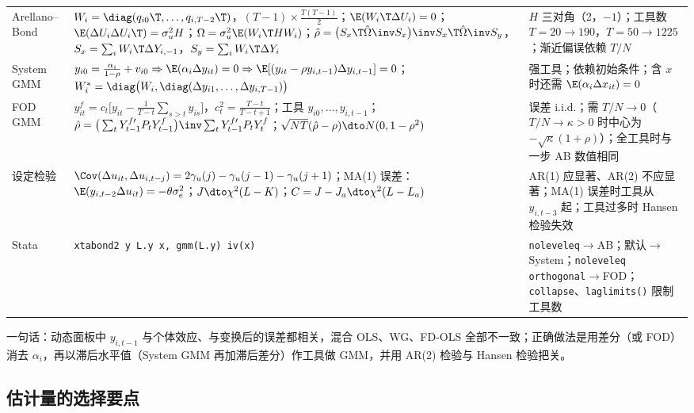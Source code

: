 {\begin{longtable}{>{\raggedright\arraybackslash}p{1.7cm}>{\raggedright\arraybackslash}p{8.0cm}>{\raggedright\arraybackslash}p{5.5cm}}
\addlinespace
Arellano--Bond & $W_i=\diag(q_{i0}\T,\dots,q_{i,T-2}\T)$，$(T-1)\times\frac{T(T-1)}{2}$；$\E(W_i\T\Delta U_i)=0$；$\E(\Delta U_i\Delta U_i\T)=\sigma_u^2H$；$\Omega=\sigma_u^2\E(W_i\T HW_i)$；$\hat\rho=\big(S_x\T\hat\Omega\inv S_x\big)\inv S_x\T\hat\Omega\inv S_y$，$S_x=\sum_iW_i\T\Delta Y_{i,-1}$，$S_y=\sum_iW_i\T\Delta Y_i$ & $H$ 三对角（2，$-1$）；工具数 $T=20\to190$，$T=50\to1225$；渐近偏误依赖 $T/N$\\
\addlinespace
System GMM & $y_{i0}=\frac{\alpha_i}{1-\rho}+v_{i0}\Rightarrow\E(\alpha_i\Delta y_{it})=0\Rightarrow\E[(y_{it}-\rho y_{i,t-1})\Delta y_{i,t-1}]=0$；$W_i^*=\diag\big(W_i,\diag(\Delta y_{i1},\dots,\Delta y_{i,T-1})\big)$ & 强工具；依赖初始条件；含 $x$ 时还需 $\E(\alpha_i\Delta x_{it})=0$\\
\addlinespace
FOD GMM & $y_{it}^f=c_t\big[y_{it}-\frac{1}{T-t}\sum_{s>t}y_{is}\big]$，$c_t^2=\frac{T-t}{T-t+1}$；工具 $y_{i0},\dots,y_{i,t-1}$；$\hat\rho=\big(\sum_tY_{t-1}^{f\prime}P_tY_{t-1}^f\big)\inv\sum_tY_{t-1}^{f\prime}P_tY_t^f$；$\sqrt{NT}(\hat\rho-\rho)\dto N(0,1-\rho^2)$ & 误差 i.i.d.；需 $T/N\to0$（$T/N\to\kappa>0$ 时中心为 $-\sqrt\kappa(1+\rho)$）；全工具时与一步 AB 数值相同\\
\addlinespace
设定检验 & $\Cov(\Delta u_{it},\Delta u_{i,t-j})=2\gamma_u(j)-\gamma_u(j-1)-\gamma_u(j+1)$；MA(1) 误差：$\E(y_{i,t-2}\Delta u_{it})=-\theta\sigma_e^2$；$J\dto\chi^2(L-K)$；$C=J-J_a\dto\chi^2(L-L_a)$ & AR(1) 应显著、AR(2) 不应显著；MA(1) 误差时工具从 $y_{i,t-3}$ 起；工具过多时 Hansen 检验失效\\
\addlinespace
Stata & \texttt{xtabond2 y L.y x, gmm(L.y) iv(x)} & \texttt{noleveleq}$\to$AB；默认$\to$System；\texttt{noleveleq orthogonal}$\to$FOD；\texttt{collapse}、\texttt{laglimits()} 限制工具数\\
\end{longtable}
}

一句话：动态面板中 $y_{i,t-1}$ 与个体效应、与变换后的误差都相关，混合 OLS、WG、FD-OLS 全部不一致；正确做法是用差分（或 FOD）消去 $\alpha_i$，再以滞后水平值（System GMM 再加滞后差分）作工具做 GMM，并用 AR(2) 检验与 Hansen 检验把关。

\subsection{估计量的选择要点}

